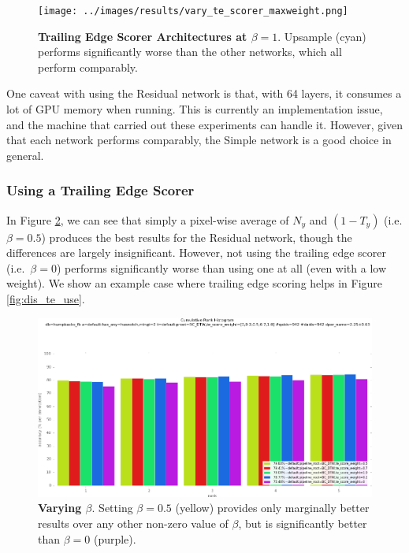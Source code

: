 \begin{figure}[t]%
\centering
\texttt{[image: ../images/results/vary\_te\_scorer\_maxweight.png]}
\caption{\textbf{Trailing Edge Scorer Architectures at $\beta = 1$}. Upsample (cyan) performs significantly worse than the other networks, which all perform comparably.}
\label{fig:vary_te_scorer_maxweight}
\end{figure}

One caveat with using the Residual network is that, with 64 layers, it consumes a lot of GPU memory when running.
This is currently an implementation issue, and the machine that carried out these experiments can handle it.
However, given that each network performs comparably, the Simple network is a good choice in general.

\subsubsection{Using a Trailing Edge Scorer}

In Figure \ref{fig:vary_te_weight}, we can see that simply a pixel-wise average of $N_y$ and $(1-T_y)$ (i.e. $\beta = 0.5$) produces the best results for the Residual network, though the differences are largely insignificant.
However, not using the trailing edge scorer (i.e.\ $\beta = 0$) performs significantly worse than using one at all (even with a low weight).
We show an example case where trailing edge scoring helps in Figure \ref{fig:dis_te_use}.

\begin{figure}[t]%
\centering
\includegraphics[width=1\textwidth]{../images/results/vary_te_weight.png}
\caption{\textbf{Varying $\beta$}. Setting $\beta = 0.5$ (yellow) provides only marginally better results over any other non-zero value of $\beta$, but is significantly better than $\beta = 0$ (purple).}
\label{fig:vary_te_weight}
\end{figure}


